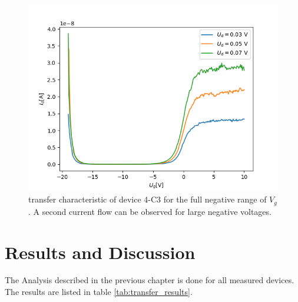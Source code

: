 \documentclass[%
 reprint,
amsmath,amssymb,
pra,
]{revtex4-1}
\begin{document}
\begin{figure}
\centering
\includegraphics[scale=0.6]{Bilder/amipol.png}
\caption{transfer characteristic of device 4-C3 for the full negative range of $V_g$. A second current flow can be observed for large negative voltages.}
\label{fig:ambipol}
\end{figure}


\section{Results and Discussion}
The Analysis described in the previous chapter is done for all measured devices. The results are listed in table \ref{tab:transfer_results}.\\
\\
\end{document}
